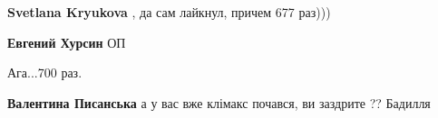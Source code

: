 \begin{itemize}
\begin{itemize}
\textbf{Svetlana Kryukova} , да сам лайкнул, причем 677 раз)))

 
\textbf{Евгений Хурсин} ОП \Smiley[1.0][yellow]

 
Ага...700 раз.

 
\textbf{Валентина Писанська} а у вас вже клімакс почався, ви заздрите ?? Бадилля


\end{itemize}

\end{itemize}

